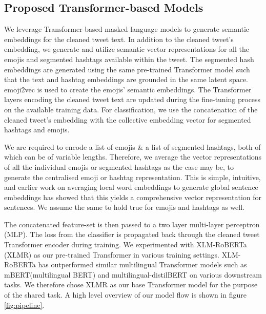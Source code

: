 \documentclass[
]{ceurart}
\begin{document}
\subsection{Proposed Transformer-based Models}

We leverage Transformer-based\cite{vaswani2017attention} masked language models to generate semantic embeddings for the cleaned tweet text. In addition to the cleaned tweet’s embedding, we generate and utilize semantic vector representations for all the emojis and segmented hashtags available within the tweet. The segmented hash embeddings are generated using the same pre-trained Transformer model such that the text and hashtag embeddings are grounded in the same latent space. emoji2vec is used to create the emojis' semantic embeddings. The Transformer layers encoding the cleaned tweet text are updated during the fine-tuning process on the available training data. For classification, we use the concatenation of the cleaned tweet's embedding with the collective embedding vector for segmented hashtags and emojis.

We are required to encode a list of emojis \& a list of segmented hashtags, both of which can be of variable lengths. Therefore, we average the vector representations of all the individual emojis or segmented hashtags as the case may be, to generate the centralised emoji or hashtag representation. This is simple, intuitive, and earlier work on averaging local word embeddings to generate global sentence embeddings\cite{arora2016simple} has showed that this yields a comprehensive vector representation for sentences. We assume the same to hold true for emojis and hashtags as well.

The concatenated feature-set is then passed to a two layer multi-layer perceptron (MLP). The loss from the classifier is propagated back through the cleaned tweet Transformer encoder during training. We experimented with XLM-RoBERTa (XLMR)\cite{conneau2020unsupervised} as our pre-trained Transformer in various training settings. XLM-RoBERTa has outperformed similar multilingual Transformer models such as mBERT(multilingual BERT)\cite{devlin2018bert} and multilingual-distilBERT \cite{sanh2020distilbert} on various downstream tasks. We therefore chose XLMR as our base Transformer model for the purpose of the shared task. A high level overview of our model flow is shown in figure \ref{fig:pipeline}.

\end{document}
